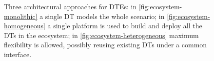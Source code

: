 \begin{figure}[ht]
    \centering
    \caption{Three architectural approaches for \acp{DTE}: in \ref{fig:ecosystem-monolithic} a single \ac{DT} models the whole scenario; in \ref{fig:ecosystem-homogeneous} a single platform is used to build and deploy all the \acp{DT} in the ecosystem; in \ref{fig:ecosystem-heterogeneous} maximum flexibility is allowed, possibly reusing existing \acp{DT} under a common interface.}
    \label{fig:ecosystem-types}
\end{figure}


